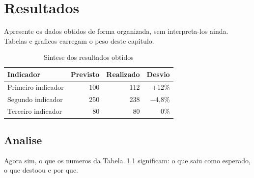 \chapter{Resultados}
\label{cap:resultados}

Apresente os dados obtidos de forma organizada, sem interpreta-los ainda.
Tabelas e graficos carregam o peso deste capitulo.

\begin{table}[htb]
  \centering
  \caption{Sintese dos resultados obtidos}
  \label{tab:resultados}
  \begin{tabular}{lrrr}
    \toprule
    \textbf{Indicador} & \textbf{Previsto} & \textbf{Realizado} & \textbf{Desvio} \\
    \midrule
    Primeiro indicador & 100 & 112 & +12\% \\
    Segundo indicador  & 250 & 238 & $-$4,8\% \\
    Terceiro indicador &  80 &  80 & 0\% \\
    \bottomrule
  \end{tabular}
\end{table}

\section{Analise}
\label{sec:analise}

Agora sim, o que os numeros da Tabela~\ref{tab:resultados} significam: o que
saiu como esperado, o que destoou e por que.
